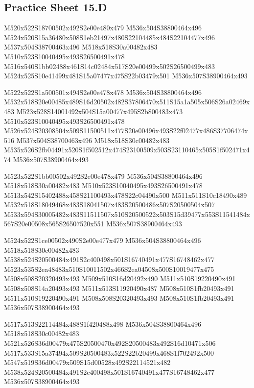 \documentclass{article}
\begin{document}
\subsection{Practice Sheet 15.D}

\begin{multicols}{5}
\begin{center}

M520x522S18700502x492S2e00e480x479 %
M536x504S38800464x496 %
M524x520S15a36480x508S1eb21497x480S22104485x484S22104477x496 %
M537x504S38700463x496 %
M518x518S30a00482x483 %
M510x523S10040495x493S26500491x478 %
M516x540S1bb02488x461S14c02484x517S20e00499x502S26500499x483 %
M524x525S10e41499x481S15a07477x475S22b03479x501 %
M536x507S38900464x493 %
\vfil
\columnbreak

M522x522S1a500501x494S2e00e478x478 %
M536x504S38800464x496 %
M532x518S20e00485x489S16d20502x482S37806470x511S15a1a505x506S26a02469x483 %
M523x528S14001492x504S15a00477x495S2b800483x473 %
M510x523S10040495x493S26500491x478 %
M526x524S20308504x509S11500511x477S20e00496x493S22f02477x486S37706474x516 %
M537x504S38700463x496 %
M518x518S30c00482x483 %
M535x526S2fb04491x520S1f502512x474S23100509x503S23110465x505S1f502471x474 %
M536x507S38900464x493 %
\vfil
\columnbreak

M523x522S1bb00502x492S2e00e478x479 %
M536x504S38800464x496 %
M518x518S30a00482x483 %
M510x523S10040495x493S26500491x478 %
M513x542S15402488x458S21100493x478S22c04490x500 %
M511x511S10c18490x489 %
M532x518S18049468x483S18041507x483S20500486x507S20500504x507 %
M533x594S30005482x483S11511507x510S20500522x503S15d39477x553S11541484x567S20e00508x565S26507520x551 %
M536x507S38900464x493 %
\vfil
\columnbreak

M524x522S1ce00502x490S2e00e477x479 %
M536x504S38800464x496 %
M518x518S30c00482x483 %
M538x524S20500484x491S2c400498x501S16740491x477S16748462x477 %
M523x535S2ea48483x510S10011502x466S2ea04508x500S10019477x475 %
M508x508S20320493x493 %
M509x510S16d20492x490 %
M511x510S19220490x491 %
M508x508S14a20493x493 %
M511x513S11920490x487 %
M508x510S1fb20493x491 %
M511x510S19220490x491 %
M508x508S20320493x493 %
M508x510S1fb20493x491 %
M536x507S38900464x493 %
\vfil
\columnbreak

M517x513S22114484x488S1f420488x498 %
M536x504S38800464x496 %
M518x518S30c00482x483 %
M521x526S36d00479x475S20500470x492S20500483x492S16d10471x506 %
M517x533S15a37494x509S20500483x522S22b20499x468S1f702492x500 %
M547x519S36d00479x509S15d00528x492S22114521x482 %
M538x524S20500484x491S2c400498x501S16740491x477S16748462x477 %
M536x507S38900464x493 %
\vfil

\end{center}
\end{multicols}
\end{document}

